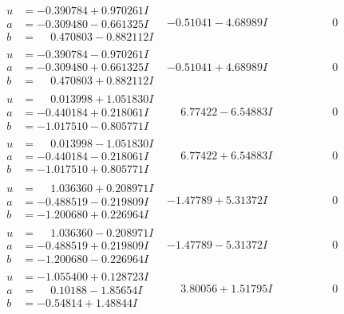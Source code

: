 \documentclass[1p]{elsarticle_modified}
\theoremstyle{definition}
\begin{document}
$$\begin{array}{c|c|c}
\begin{aligned}
u &= -0.390784 + 0.970261 I \\
a &= -0.309480 - 0.661325 I \\
b &= \phantom{-}0.470803 - 0.882112 I\end{aligned}
 & -0.51041 - 4.68989 I & \phantom{-0.000000 } 0 \\ \hline\begin{aligned}
u &= -0.390784 - 0.970261 I \\
a &= -0.309480 + 0.661325 I \\
b &= \phantom{-}0.470803 + 0.882112 I\end{aligned}
 & -0.51041 + 4.68989 I & \phantom{-0.000000 } 0 \\ \hline\begin{aligned}
u &= \phantom{-}0.013998 + 1.051830 I \\
a &= -0.440184 + 0.218061 I \\
b &= -1.017510 - 0.805771 I\end{aligned}
 & \phantom{-}6.77422 - 6.54883 I & \phantom{-0.000000 } 0 \\ \hline\begin{aligned}
u &= \phantom{-}0.013998 - 1.051830 I \\
a &= -0.440184 - 0.218061 I \\
b &= -1.017510 + 0.805771 I\end{aligned}
 & \phantom{-}6.77422 + 6.54883 I & \phantom{-0.000000 } 0 \\ \hline\begin{aligned}
u &= \phantom{-}1.036360 + 0.208971 I \\
a &= -0.488519 - 0.219809 I \\
b &= -1.200680 + 0.226964 I\end{aligned}
 & -1.47789 + 5.31372 I & \phantom{-0.000000 } 0 \\ \hline\begin{aligned}
u &= \phantom{-}1.036360 - 0.208971 I \\
a &= -0.488519 + 0.219809 I \\
b &= -1.200680 - 0.226964 I\end{aligned}
 & -1.47789 - 5.31372 I & \phantom{-0.000000 } 0 \\ \hline\begin{aligned}
u &= -1.055400 + 0.128723 I \\
a &= \phantom{-}0.10188 - 1.85654 I \\
b &= -0.54814 + 1.48844 I\end{aligned}
 & \phantom{-}3.80056 + 1.51795 I & \phantom{-0.000000 } 0 \\ \hline\begin{aligned}

\end{aligned}
\end{array}$$
\end{document}
